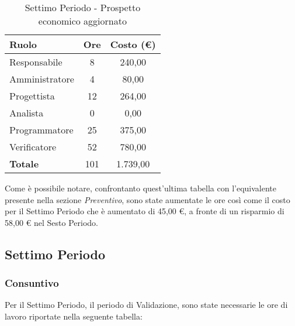 \documentclass[../PianoDiProgetto_v4.0.0.tex]{subfiles}
\begin{document}
		\begin{table}[h]
			\centering
			\begin{tabular}{l * {2}{c}}
			\toprule
			\textbf{Ruolo} & \textbf{Ore} & \textbf{Costo (\euro{})} \\
			\midrule
			Responsabile & 8 & 240,00 \\
			Amministratore & 4 & 80,00 \\
			Progettista & 12 & 264,00 \\
			Analista & 0 & 0,00 \\		
			Programmatore & 25 & 375,00 \\		
			Verificatore & 52 & 780,00 \\				
			\midrule		
			\textbf{Totale} & 101 & 1.739,00 \\
			\bottomrule	
			\end{tabular}
			\caption{Settimo Periodo - Prospetto economico aggiornato}	
		\end{table}
		
		Come è possibile notare, confrontanto quest'ultima tabella con l'equivalente presente nella sezione \textit{Preventivo}, sono state aumentate le ore così come il costo per il Settimo Periodo che è aumentato di 45,00 \euro{}, a fronte di un risparmio di 58,00 \euro{} nel Sesto Periodo.
		
		\subsection{Settimo Periodo}
		\subsubsection{Consuntivo}
		Per il Settimo Periodo, il periodo di Validazione, sono state necessarie le ore di lavoro riportate nella seguente tabella:
		
\end{document}
